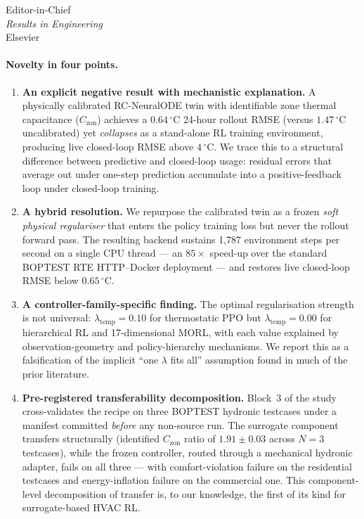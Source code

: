 \documentclass[11pt,a4paper]{letter}
\begin{document}
\begin{letter}{Editor-in-Chief \\
               \textit{Results in Engineering} \\
               Elsevier}
\paragraph{Novelty in four points.}
\begin{enumerate}
  \item \textbf{An explicit negative result with mechanistic
        explanation.} A physically calibrated RC-NeuralODE twin with
        identifiable zone thermal capacitance ($C_\mathrm{zon}$)
        achieves a $0.64\,^{\circ}\mathrm{C}$ 24-hour rollout RMSE
        (versus $1.47\,^{\circ}\mathrm{C}$ uncalibrated) yet
        \emph{collapses} as a stand-alone RL training environment,
        producing live closed-loop RMSE above
        $4\,^{\circ}\mathrm{C}$. We trace this to a structural
        difference between predictive and closed-loop usage: residual
        errors that average out under one-step prediction accumulate
        into a positive-feedback loop under closed-loop training.
  \item \textbf{A hybrid resolution.} We repurpose the calibrated
        twin as a frozen \emph{soft physical regulariser} that enters
        the policy training loss but never the rollout forward pass.
        The resulting backend sustains 1{,}787 environment steps per
        second on a single CPU thread --- an $85\times$ speed-up over
        the standard BOPTEST RTE HTTP--Docker deployment --- and
        restores live closed-loop RMSE below
        $0.65\,^{\circ}\mathrm{C}$.
  \item \textbf{A controller-family-specific finding.} The optimal
        regularisation strength is not universal: $\lambda_\mathrm{temp}=0.10$
        for thermostatic PPO but $\lambda_\mathrm{temp}=0.00$ for
        hierarchical RL and 17-dimensional MORL, with each value
        explained by observation-geometry and policy-hierarchy
        mechanisms. We report this as a falsification of the implicit
        ``one $\lambda$ fits all'' assumption found in much of the
        prior literature.
  \item \textbf{Pre-registered transferability decomposition.}
        Block~3 of the study cross-validates the recipe on three
        BOPTEST hydronic testcases under a manifest committed
        \emph{before} any non-source run. The surrogate component
        transfers structurally (identified $C_\mathrm{zon}$ ratio of
        $1.91 \pm 0.03$ across $N=3$ testcases), while the frozen
        controller, routed through a mechanical hydronic adapter,
        fails on all three --- with comfort-violation failure on the
        residential testcases and energy-inflation failure on the
        commercial one. This component-level decomposition of transfer
        is, to our knowledge, the first of its kind for surrogate-based
        HVAC RL.
\end{enumerate}


\end{letter}
\end{document}
